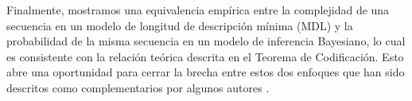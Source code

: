Finalmente, mostramos una equivalencia empírica entre la complejidad de una secuencia en un modelo de longitud de descripción mínima (MDL) y la probabilidad de la misma secuencia en un modelo de inferencia Bayesiano, lo cual es consistente con la relación teórica descrita en el Teorema de Codificación. Esto abre una oportunidad para cerrar la brecha entre estos dos enfoques que han sido descritos como complementarios por algunos autores \cite{mackay2003information}.

